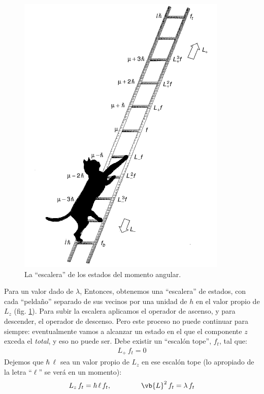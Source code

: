 \begin{figure}[H]
    \centering
    \includegraphics[scale=0.6]{Imagenes/Operadores_Escalera_01.png}
    \caption{La \enquote{escalera} de los estados del momento angular.}
    \label{fig:figura_escalera_01}
\end{figure}
Para un valor dado de $\lambda$, Entonces, obtenemos una \enquote{escalera} de estados, con cada \enquote{peldaño} separado de sus vecinos por una unidad de $h$ en el valor propio de $L_{z}$ (fig. \ref{fig:figura_escalera_01}). Para subir la escalera aplicamos el operador de ascenso, y para descender, el operador de descenso. Pero este proceso no puede continuar para siempre: eventualmente vamos a alcanzar un estado en el que el componente $z$ exceda el \emph{total}, y eso no puede ser. Debe existir un \enquote{escalón tope}, $f_{t}$, tal que:
\begin{align}
L_{+} \, f_{t} = 0
\label{eq:ecuacion_04_110}
\end{align}
Dejemos que $\hbar \, \ell$ sea un valor propio de $L_{z}$ en ese escalón tope (lo apropiado de la letra \enquote{$\ell$} se verá en un momento):
\begin{align}
L_{z} \, f_{t} = \hbar \, \ell \, f_{t}, \hspace{1.5cm} \vb{L}^{2} \, f_{t} = \lambda \, f_{t}
\label{eq:ecuacion_04_111}
\end{align}
